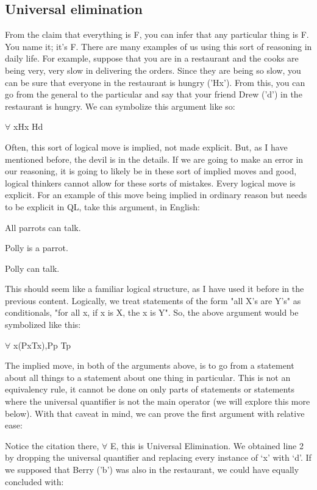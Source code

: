 \subsection{Universal elimination}
From the claim that everything is F, you can infer that any particular thing is F. You name it; it’s F. There are many examples of us using this sort of reasoning in daily life. For example, suppose that you are in a restaurant and the cooks are being very, very slow in delivering the orders. Since they are being so slow, you can be sure that everyone in the restaurant is hungry ('Hx'). From this, you can go from the general to the particular and say that your friend Drew ('d') in the restaurant is hungry. We can symbolize this argument like so:
\begin{center}
$\forall$  xHx \therefore  Hd
\end{center}
Often, this sort of logical move is implied, not made explicit. But, as I have mentioned before, the devil is in the details. If we are going to make an error in our reasoning, it is going to likely be in these sort of implied moves and good, logical thinkers cannot allow for these sorts of mistakes. Every logical move is explicit. For an example of this move being implied in ordinary reason but needs to be explicit in QL, take this argument, in English:
\begin{earg}
\item[]All parrots can talk.
\item[]Polly is a parrot.
\item[\therefore ] Polly can talk.
\end{earg}
This should seem like a familiar logical structure, as I have used it before in the previous content. Logically, we treat statements of the form "all X's are Y's" as conditionals, "for all x, if x is X, the x is Y". So, the above argument would be symbolized like this:
\begin{center}
$\forall$  x(Px\eif Tx),Pp \therefore  Tp
\end{center}
 The implied move, in both of the arguments above, is to go from a statement about all things to a statement about one thing in particular. This is not  an equivalency rule, it cannot be done on only parts of statements or statements where the universal quantifier is not the main operator (we will explore this more below). With that caveat in mind, we can prove the first argument with relative ease:
\begin{fitchproof}
\end{fitchproof}
Notice the citation there, $\forall$ E, this is Universal Elimination. We obtained line 2 by dropping the universal quantifier and replacing every instance of ‘x’ with ‘d'. If we supposed that Berry ('b') was also in the restaurant, we could have equally concluded with:

